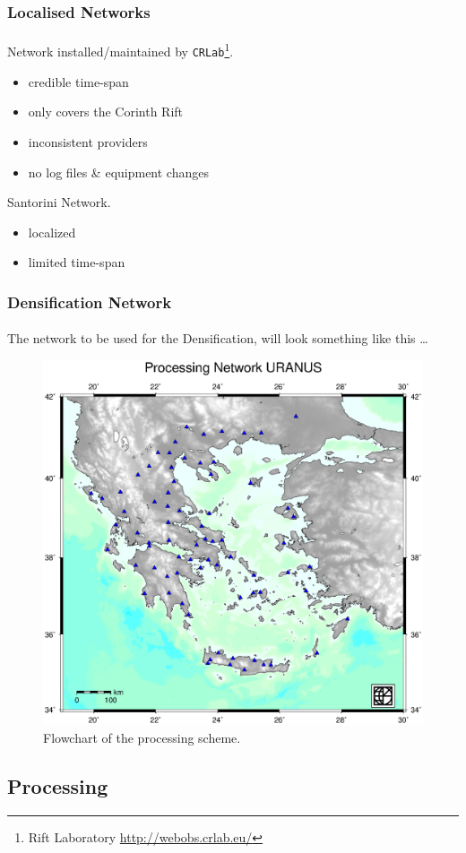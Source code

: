 \documentclass{beamer}
\begin{document}
\begin{frame}\frametitle{Localised Networks}\framesubtitle{}
  Network installed/maintained by \texttt{CRLab}\footnote{Rift Laboratory \url{http://webobs.crlab.eu/}}. 
  \begin{itemize}
    \item<pro@1-> credible time-span
    \item<pro@1-> only covers the Corinth Rift
    \item<con@1-> inconsistent providers
    \item<con@1-> no log files \& equipment changes
  \end{itemize}

  Santorini Network. 
  \begin{itemize}
    \item<con@1-> localized
    \item<con@1-> limited time-span
  \end{itemize}

\end{frame}

\begin{frame}\frametitle{Densification Network}\framesubtitle{}
  The network to be used for the Densification, will look something like this \ldots
 \begin{figure}
 \begin{center}
 \includegraphics[width=.5\textwidth]{img/uranusnet.eps}
 \caption{Flowchart of the processing scheme.}
 \label{fig:dgrm}
 \end{center}
 \end{figure}
\end{frame}

\subsection{Processing}
\end{document}
